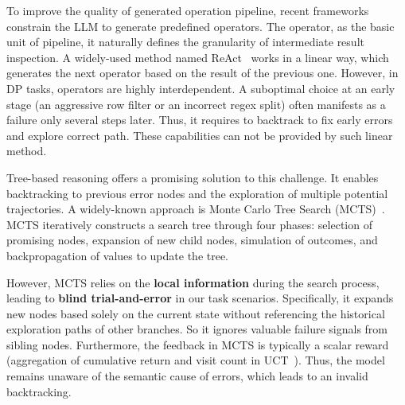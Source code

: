 To improve the quality of generated operation pipeline, recent frameworks~\cite{fan2024autoprep, ge2025text}
constrain
the LLM to generate predefined operators. The operator, as the basic unit of pipeline, it naturally defines the granularity of intermediate result inspection.
A widely-used method named ReAct~\cite{aksitov2023rest} works in a linear way, which generates the next operator based on the result of the previous one. 
However, in DP tasks, operators are highly interdependent. A suboptimal choice at an early stage (\eg an aggressive row filter or an incorrect regex split) often manifests as a failure only several steps later. Thus, it requires to backtrack to fix early errors and explore correct path. These capabilities can not be provided by such linear method.

Tree-based reasoning offers a promising solution to this challenge. It enables backtracking to previous error nodes and the exploration of multiple potential trajectories. A widely-known approach is Monte Carlo Tree Search (MCTS)~\cite{li2025alphasql, ge2025monteprep}. MCTS iteratively constructs a search tree through four phases: {selection} of promising nodes, {expansion} of new child nodes, {simulation} of outcomes, and {backpropagation} of values to update the tree.

However, MCTS relies on the \textbf{local information} during the search process, leading to \textbf{blind trial-and-error} in our task scenarios. 
Specifically, it expands new nodes based solely on the current state without referencing the historical exploration paths of other branches. So it ignores valuable failure signals from sibling nodes. Furthermore, the feedback in MCTS is typically a {scalar reward} (\eg aggregation of cumulative return and visit count in UCT~\cite{ameneyro2022towards}). Thus, the model remains unaware of the semantic cause of errors, which leads to an invalid backtracking.

